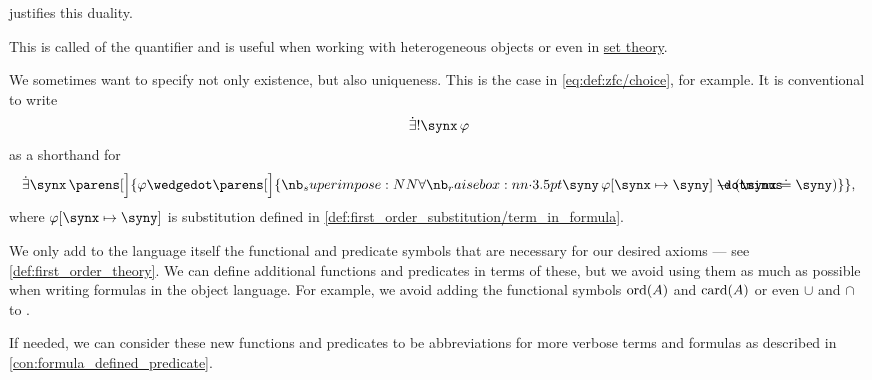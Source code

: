 \begin{remark}
\begin{thmenum}
     justifies this duality.

    This is called  of the quantifier and is useful when working with heterogeneous objects or even in \hyperref[ch:set_theory]{set theory}.

     We sometimes want to specify not only existence, but also uniqueness. This is the case in \eqref{eq:def:zfc/choice}, for example. It is conventional to write
    \begin{equation*}
      \qExists \synx \varphi
    \end{equation*}
    as a shorthand for
    \begin{equation*}
      \qexists \synx \parens[\Big]{ \varphi \synwedge \parens[\Big]{ \qforall \syny \varphi[\synx \mapsto \syny] \synimplies (\synx \syneq \syny) } },
    \end{equation*}
    where \( \varphi[\synx \mapsto \syny] \) is substitution defined in \cref{def:first_order_substitution/term_in_formula}.

     We only add to the language itself the functional and predicate symbols that are necessary for our desired axioms --- see \cref{def:first_order_theory}. We can define additional functions and predicates in terms of these, but we avoid using them as much as possible when writing formulas in the object language. For example, we avoid adding the functional symbols \hyperref[thm:well_ordered_order_type_existence]{\( \operatorname{ord}(A) \)} and \hyperref[def:cardinal]{\( \operatorname{card}(A) \)} or even \hyperref[def:basic_set_operations/union]{\( \cup \)} and \hyperref[def:basic_set_operations/intersection]{\( \cap \)} to \hyperref[def:zfc]{}.

    If needed, we can consider these new functions and predicates to be abbreviations for more verbose terms and formulas as described in \cref{con:formula_defined_predicate}.
  \end{thmenum}
\end{remark}

